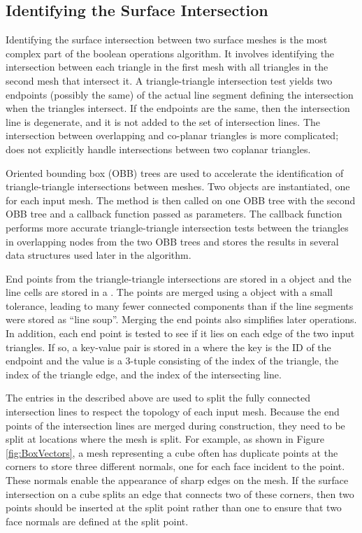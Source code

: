 \documentclass{InsightArticle}
\begin{document}
\subsection{Identifying the Surface Intersection}

Identifying the surface intersection between two surface meshes is the most complex part of the boolean operations algorithm. It involves identifying the intersection between each triangle in the first mesh with all triangles in the second mesh that intersect it. A triangle-triangle intersection test yields two endpoints (possibly the same) of the actual line segment defining the intersection when the triangles intersect. If the endpoints are the same, then the intersection line is degenerate, and it is not added to the set of intersection lines. The intersection between overlapping and co-planar triangles is more complicated;  does not explicitly handle intersections between two coplanar triangles.

Oriented bounding box (OBB) trees are used to accelerate the identification of triangle-triangle intersections between meshes. Two  objects are instantiated, one for each input mesh. The method  is then called on one OBB tree with the second OBB tree and a callback function passed as parameters. The callback function performs more accurate triangle-triangle intersection tests between the triangles in overlapping nodes from the two OBB trees and stores the results in several data structures used later in the algorithm.

End points from the triangle-triangle intersections are stored in a  object and the line cells are stored in a . The points  are merged using a  object with a small tolerance, leading to many fewer connected components than if the line segments were stored as ``line soup''. Merging the end points also simplifies later operations. In addition, each end point is tested to see if it lies on each edge of the two input triangles. If so, a key-value pair is stored in a  where the key is the ID of the endpoint and the value is a 3-tuple consisting of the index of the triangle, the index of the triangle edge, and the index of the intersecting line.

The entries in the  described above are used to split the fully connected intersection lines to respect the topology of each input mesh. Because the end points of the intersection lines are merged during construction, they need to be split at locations where the mesh is split. For example, as shown in Figure \ref{fig:BoxVectors}, a mesh representing a cube often has duplicate points at the corners to store three different normals, one for each face incident to the point. These normals enable the appearance of sharp edges on the mesh. If the surface intersection on a cube splits an edge that connects two of these corners, then two points should be inserted at the split point rather than one to ensure that two face normals are defined at the split point.
\end{document}
